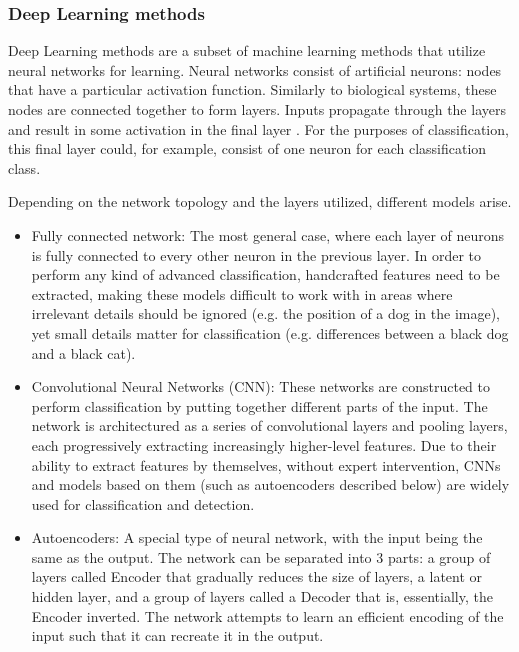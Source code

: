 \subsubsection{Deep Learning methods}

Deep Learning methods are a subset of machine learning methods that utilize neural networks for learning. Neural networks consist of artificial neurons: nodes that have a particular activation function. Similarly to biological systems, these nodes are connected together to form layers. Inputs propagate through the layers and result in some activation in the final layer \cite{neural_networks}. For the purposes of classification, this final layer could, for example, consist of one neuron for each classification class.

Depending on the network topology and the layers utilized, different models arise. \cite{deep_learning}
\begin{itemize}
    \item Fully connected network: The most general case, where each layer of neurons is fully connected to every other neuron in the previous layer. In order to perform any kind of advanced classification, handcrafted features need to be extracted, making these models difficult to work with in areas where irrelevant details should be ignored (e.g. the position of a dog in the image), yet small details matter for classification (e.g. differences between a black dog and a black cat).
    \item Convolutional Neural Networks (CNN): These networks are constructed to perform classification by putting together different parts of the input. The network is architectured as a series of convolutional layers and pooling layers, each progressively extracting increasingly higher-level features. Due to their ability to extract features by themselves, without expert intervention, CNNs and models based on them (such as autoencoders described below) are widely used for classification and detection.
    \item Autoencoders: A special type of neural network, with the input being the same as the output. The network can be separated into 3 parts: a group of layers called Encoder that gradually reduces the size of layers, a latent or hidden layer, and a group of layers called a Decoder that is, essentially, the Encoder inverted. The network attempts to learn an efficient encoding of the input such that it can recreate it in the output. 
\end{itemize}

